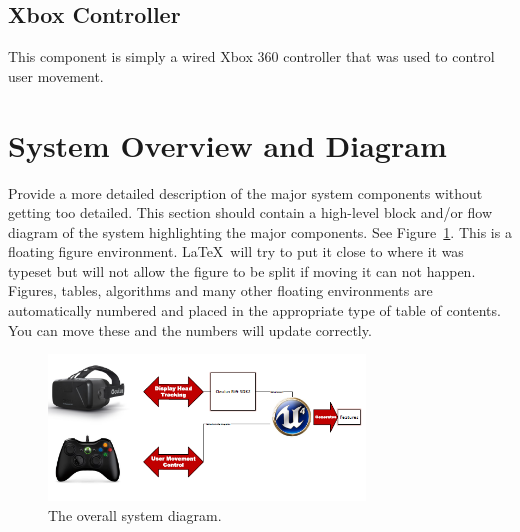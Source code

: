 \subsection{Xbox Controller}
This component is simply a wired Xbox 360 controller that was used to control user movement. 

\section{System Overview and Diagram}
Provide a more detailed description of the major system components
without getting too detailed.  This section should contain a
high-level block and/or flow diagram of the system highlighting the
major components.  See Figure~\ref{systemdiagram}.  This is a floating
figure environment.  \LaTeX\ will try to put it close to where it was
typeset but will not allow the figure to be split if moving it can not
happen.  Figures, tables, algorithms and many other floating
environments are automatically numbered and placed in the appropriate
type of table of contents.  You can move these and the numbers will
update correctly.

\begin{figure}[tbh]
\begin{center}
\includegraphics[width=0.75\textwidth]{Diagrams/SystemDiagram.png}
\end{center}
\caption{The overall system diagram. \label{systemdiagram}}
\end{figure}

